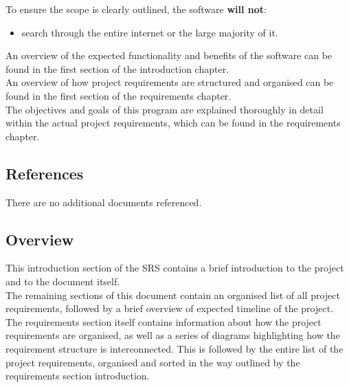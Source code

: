 To ensure the scope is clearly outlined, the software \textbf{will not}:
\begin{itemize}
    \item search through the entire internet or the large majority of it.
\end{itemize}

An overview of the expected functionality and benefits of the software can be found in the first section of the introduction chapter. \\

An overview of how project requirements are structured and organised can be found in the first section of the requirements chapter. \\

The objectives and goals of this program are explained thoroughly in detail within the actual project requirements, which can be found in the requirements chapter. \\

\subsection{References}

There are no additional documents referenced.

\subsection{Overview}

This introduction section of the SRS contains a brief introduction to the project \projectname{} and to the document itself. \\

The remaining sections of this document contain an organised list of all project requirements, followed by a brief overview of expected timeline of the project. \\

The requirements section itself contains information about how the project requirements are organised, as well as a series of diagrams highlighting how the requirement structure is interconnected.
This is followed by the entire list of the project requirements, organised and sorted in the way outlined by the requirements section introduction. \\

